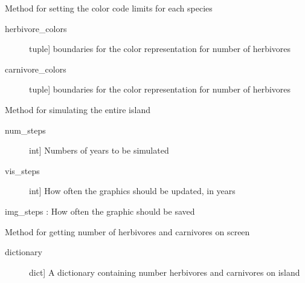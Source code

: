 \documentclass[a4paper,10pt,english]{sphinxmanual}
\begin{document}
\begin{fulllineitems}
\begin{fulllineitems}
\begin{description}
\end{description}

\end{fulllineitems}


\begin{fulllineitems}
\label{\detokenize{simulation:biosim.simulation.BioSim.set_color_code_limits}}
Method for setting the color code limits for each species
\begin{description}
\item[{herbivore\_colors}] \leavevmode{[}tuple{]}
boundaries for the color representation for number of herbivores

\item[{carnivore\_colors}] \leavevmode{[}tuple{]}
boundaries for the color representation for number of herbivores

\end{description}

\end{fulllineitems}


\begin{fulllineitems}
\label{\detokenize{simulation:biosim.simulation.BioSim.simulate}}
Method for simulating the entire island
\begin{description}
\item[{num\_steps}] \leavevmode{[}int{]}
Numbers of years to be simulated

\item[{vis\_steps}] \leavevmode{[}int{]}
How often the graphics should be updated, in years

\end{description}

img\_steps : How often the graphic should be saved

\end{fulllineitems}


\begin{fulllineitems}
\label{\detokenize{simulation:biosim.simulation.BioSim.status_number_of_animals_by_species}}
Method for getting number of herbivores and carnivores on screen
\begin{description}
\item[{dictionary}] \leavevmode{[}dict{]}
A dictionary containing number herbivores and carnivores on island


\end{description}
\end{fulllineitems}
\end{fulllineitems}
\end{document}
